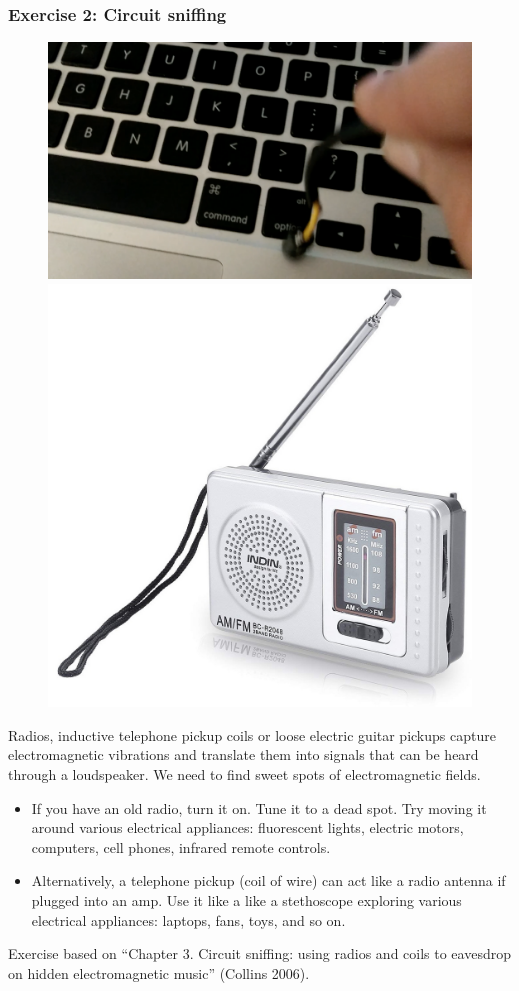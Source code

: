 \documentclass[screen, aspectratio=43]{beamer}
\begin{document}
\begin{frame}
  \frametitle{Exercise 2: Circuit sniffing}
   \begin{figure}
	\includegraphics[scale=0.08]{img/pickup.png}
	\includegraphics[scale=0.08]{img/battery-powered-radio.jpg}	
\end{figure}
{\scriptsize 
Radios, inductive telephone pickup coils or loose electric guitar pickups capture electromagnetic vibrations and translate them into signals that can be heard through a loudspeaker. We need to find sweet spots of electromagnetic fields.
    \begin{itemize}
	\item If you have an old radio, turn it on. Tune it to a dead spot. Try moving it around various electrical appliances: fluorescent lights, electric motors, computers, cell phones, infrared remote controls. 
	\item Alternatively, a telephone pickup (coil of wire) can act like a radio antenna if plugged into an amp. Use it like a like a stethoscope exploring various electrical appliances: laptops, fans, toys, and so on.
    \end{itemize}   
}    
{\tiny
Exercise based on ``Chapter 3. Circuit sniffing: using radios and coils to eavesdrop on hidden electromagnetic music'' (Collins 2006).
}
\end{frame}
\end{document}
